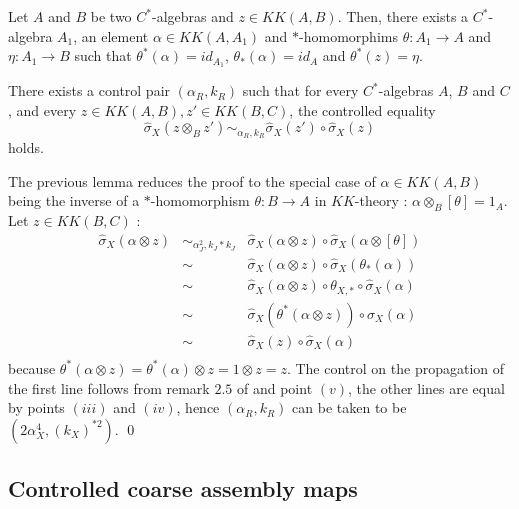 \begin{lem} Let $A$ and $B$ be two $C^*$-algebras and $z\in KK(A,B)$. Then, there exists a $C^*$-algebra $A_1$, an element $\alpha \in KK(A,A_1)$ and $*$-homomorphims $\theta : A_1 \rightarrow A$ and $\eta : A_1 \rightarrow B$ such that
$\theta^*(\alpha) = id_{A_1}$, $\theta_*(\alpha) = id_{A}$ and $\theta^*(z) = \eta$.
\end{lem}

\begin{prop} There exists a control pair $(\alpha_R,k_R)$ such that for every $C^*$-algebras $A$, $B$ and $C$, and every $z\in KK(A,B),z'\in KK(B,C)$, the controlled equality
\[\hat\sigma_X(z\otimes_B z') \sim_{\alpha_R,k_R} \hat\sigma_X(z')\circ \hat\sigma_X(z)\]
holds.
\end{prop}

\begin{dem}
The previous lemma reduces the proof to the special case of $\alpha\in KK(A,B)$ being the inverse of a $*$-homomorphism $\theta : B\rightarrow A$ in $KK$-theory : $\alpha\otimes_B [\theta]=1_A$. Let $z\in KK(B,C)$ :
\[\begin{array}{rcl}
\hat\sigma_X (\alpha\otimes z) & \sim_{\alpha_J^2,k_J*k_J} &  \hat\sigma_X (\alpha\otimes z)\circ \hat\sigma_X (\alpha\otimes [\theta]) \\
			& \sim & \hat\sigma_X (\alpha\otimes z)\circ \hat\sigma_X (\theta_*(\alpha))\\
			& \sim & \hat\sigma_X (\alpha\otimes z)\circ \theta_{X,*}\circ \hat\sigma_X (\alpha)\\
			& \sim & \hat\sigma_X (\theta^*(\alpha\otimes z))\circ \hat\sigma_X (\alpha)\\
			& \sim & \hat\sigma_X (z)\circ \hat\sigma_X (\alpha) \\
\end{array}\] 
because $\theta^*(\alpha\otimes z)=\theta^*(\alpha)\otimes z=1\otimes z =z$. The control on the propagation of the first line follows from remark $2.5$ of \cite{OY2} and point $(v)$, the other lines are equal by points $(iii)$ and $(iv)$, hence $(\alpha_R,k_R)$ can be taken to be $(2 \alpha_X^{4},( k_X)^{*2})$.
\qed
\end{dem}

\subsection{Controlled coarse assembly maps}

